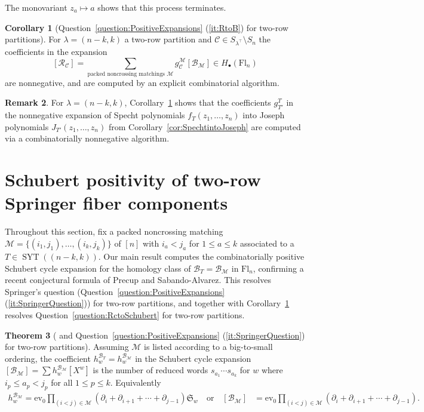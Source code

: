 \documentclass[11pt]{amsart}
\theoremstyle{definition}
\newtheorem{thm}{Theorem}[section]
\newtheorem{cor}[thm]{Corollary}
\newtheorem{rem}[thm]{Remark}
\numberwithin{equation}{section}
\newcommand{\schub}[1]{\mathfrak{S}_{#1}} %
\newcommand{\ct}{\operatorname{ev_0}} %
\newcommand{\fl}[1]{\mathrm{Fl}_{#1}}
\newcommand{\syt}{\operatorname{SYT}} %
\begin{document}
The monovariant $z_a\mapsto a$ shows that this process terminates.
\begin{cor}[{Question~\ref{question:PositiveExpansions} (\ref{it:RtoB}) for two-row partitions}]
\label{cor:expandRCintoSchuberts}
    For $\lambda=(n-k,k)$ a two-row partition and $\mathcal{C}\in S_{\lambda^{\top}}\setminus S_n$
    the coefficients in the expansion $$[\mathcal{R}_{\mathcal{C}}]=\sum_{\text{packed noncrossing matchings } \mathcal{M}} g^{\mathcal{M}}_{\mathcal{C}}[\mathcal{B}_{\mathcal{M}}]\in H_\bullet(\fl{n})$$
    are nonnegative, and are computed by an explicit combinatorial algorithm.
\end{cor}
\begin{rem}
\label{rem:JosephintoDegree}
For $\lambda=(n-k,k)$, Corollary~\ref{cor:expandRCintoSchuberts} shows that the coefficients $g_{T'}^T$ in the nonnegative expansion of Specht polynomials $f_T(z_1,\ldots,z_n)$ into Joseph polynomials $J_{T'}(z_1,\ldots,z_n)$ from Corollary~\ref{cor:SpechtintoJoseph} are computed via a combinatorially nonnegative algorithm.
\end{rem}

\section{Schubert positivity of two-row Springer fiber components}
\label{sec:Schubpostworow}
Throughout this section, fix a packed noncrossing matching
$\mathcal{M}=\{(i_1,j_1),\dots,(i_k,j_k)\}$ of $[n]$ with $i_a<j_a$ for $1\leq a\leq k$ associated to a $T\in \syt((n-k,k))$.
Our main result computes the combinatorially positive Schubert cycle expansion for the homology class of $\mathcal{B}_T=\mathcal{B}_\mathcal{M}$ in $\fl{n}$, confirming a recent conjectural formula of Precup and Sabando-Alvarez. This resolves Springer's question (Question~\ref{question:PositiveExpansions} (\ref{it:SpringerQuestion})) for two-row partitions, and together with Corollary~\ref{cor:expandRCintoSchuberts} resolves Question~\ref{question:RctoSchubert} for two-row partitions.

\begin{thm}[{\cite[Conjecture 2]{sabandoalvarez2026idealsdefiningcomponentstworow} and Question~\ref{question:PositiveExpansions} (\ref{it:SpringerQuestion}) for two-row partitions}]\label{thm:mainconjecture} Assuming $\mathcal{M}$ is listed according to a big-to-small ordering, the coefficient $h^{\mathcal{B}_T}_w=h^{\mathcal{B}_\mathcal{M}}_w$ in the Schubert cycle expansion  $[\mathcal{B}_\mathcal{M}]=\sum h^{\mathcal{B}_{\mathcal{M}}}_w[X^w]$ is the number of reduced words $s_{a_1}\cdots s_{a_k}$ for $w$ where $i_p\le a_p<j_p$ for all $1\leq p\leq k$. Equivalently
\begin{align*}h^{\mathcal{B}_\mathcal{M}}_w=\ct \prod_{(i<j)\in \mathcal{M}}(\partial_i+\partial_{i+1}+\cdots+\partial_{j-1})\schub{w}\quad\text{or}\quad[\mathcal{B}_{\mathcal{M}}]&=\ct \prod_{(i<j)\in \mathcal{M}}(\partial_i+\partial_{i+1}+\cdots+\partial_{j-1}).\end{align*}
\end{thm}
\end{document}
